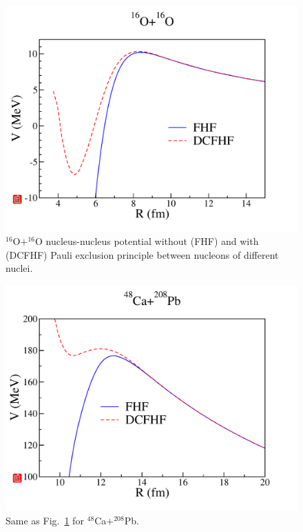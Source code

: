 \begin{figure}
	\includegraphics[width=\textwidth]{../Figures/Pauli/pot_16O+16O.pdf}
	\caption{$^{16}$O$+^{16}$O nucleus-nucleus potential without (FHF) and with (DCFHF) 
		Pauli exclusion principle between nucleons of different nuclei. }
	\label{fig:O+O}
\end{figure}

\begin{figure}
	\includegraphics[width=\textwidth]{../Figures/Pauli/pot_48Ca+208Pb.pdf}
	\caption{Same as Fig.~\ref{fig:O+O} for $^{48}$Ca$+^{208}$Pb.}
	\label{fig:Ca+Pb}
\end{figure}

